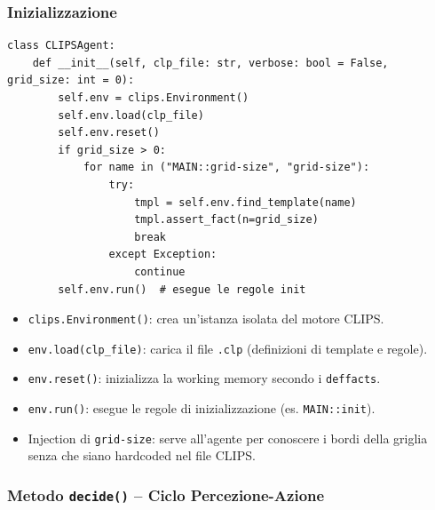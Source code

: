 \documentclass[12pt,a4paper]{article}
\begin{document}
\subsubsection{Inizializzazione}

\begin{lstlisting}[language=Python3]
class CLIPSAgent:
    def __init__(self, clp_file: str, verbose: bool = False, grid_size: int = 0):
        self.env = clips.Environment()
        self.env.load(clp_file)
        self.env.reset()
        if grid_size > 0:
            for name in ("MAIN::grid-size", "grid-size"):
                try:
                    tmpl = self.env.find_template(name)
                    tmpl.assert_fact(n=grid_size)
                    break
                except Exception:
                    continue
        self.env.run()  # esegue le regole init
\end{lstlisting}

\begin{itemize}[noitemsep]
  \item \texttt{clips.Environment()}: crea un'istanza isolata del motore CLIPS.
  \item \texttt{env.load(clp\_file)}: carica il file \texttt{.clp} (definizioni di template e regole).
  \item \texttt{env.reset()}: inizializza la working memory secondo i \texttt{deffacts}.
  \item \texttt{env.run()}: esegue le regole di inizializzazione (es. \texttt{MAIN::init}).
  \item Injection di \texttt{grid-size}: serve all'agente per conoscere i bordi
        della griglia senza che siano hardcoded nel file CLIPS.
\end{itemize}

\subsubsection{Metodo \texttt{decide()} -- Ciclo Percezione-Azione}
\end{document}
